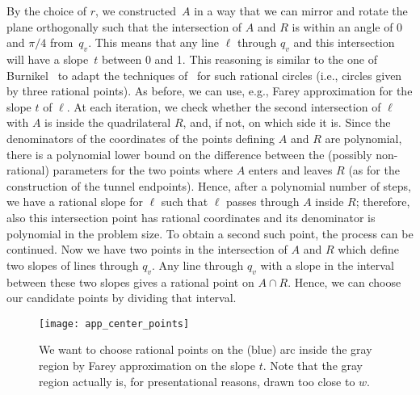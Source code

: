 \documentclass[11pt,a4paper]{article}
\begin{document}
By the choice of $r$, we constructed~$A$ in a way that we can mirror and rotate the plane orthogonally such that the intersection of $A$ and $R$ is within an angle of $0$ and $\pi/4$ from~$q_v$.
This means that any line $\ell$ through $q_v$ and this intersection will have a slope~$t$ between 0 and 1.
This reasoning is similar to the one of Burnikel~\cite{burnikel} to adapt the techniques of~\cite{canny} for such rational circles (i.e., circles given by three rational points).
As before, we can use, e.g., Farey approximation for the slope $t$ of $\ell$.
At each iteration, we check whether the second intersection of $\ell$ with $A$ is inside the quadrilateral $R$, and, if not, on which side it is.
Since the denominators of the coordinates of the points defining $A$ and $R$ are polynomial, there is a polynomial lower bound on the difference between the (possibly non-rational) parameters for the two points where $A$ enters and leaves $R$ (as for the construction of the tunnel endpoints).
Hence, after a polynomial number of steps, we have a rational slope for $\ell$ such that $\ell$ passes through $A$ inside $R$; therefore, also this intersection point has rational coordinates and its denominator is polynomial in the problem size.
To obtain a second such point, the process can be continued.
Now we have two points in the intersection of $A$ and $R$ which define two slopes of lines through $q_v$.
Any line through $q_v$ with a slope in the interval between these two slopes gives a rational point on $A \cap R$.
Hence, we can choose our candidate points by dividing that interval.

\begin{figure}
\centering
\texttt{[image: app\_center\_points]}
\caption{We want to choose rational points on the (blue) arc inside the gray region by Farey approximation on the slope $t$.
Note that the gray region actually is, for presentational reasons, drawn too close to $w$.}
\label{fig_app_center_points}
\end{figure}
\end{document}
